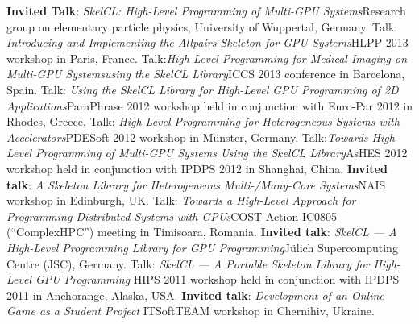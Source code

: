 \documentclass[11pt,a4paper]{moderncv}
\newcommand{\strong}[1]{\textcolor{color1}{\textbf{#1}}}
\begin{document}
         {\strong{Invited Talk}: \emph{SkelCL\@: High-Level Programming of Multi-GPU
          Systems}\newline \small Research group on elementary particle physics,
          University of Wuppertal, Germany.}
         {Talk: \emph{Introducing and Implementing the Allpairs Skeleton for GPU
          Systems}\newline \small HLPP 2013 workshop in Paris, France.}
         {Talk:\emph{High-Level Programming for Medical Imaging on Multi-GPU
          Systems\newline using the SkelCL Library}\newline \small ICCS 2013 conference in
          Barcelona, Spain.}
       {Talk: \emph{Using the SkelCL Library for High-Level GPU Programming of
        2D Applications}\newline \small ParaPhrase 2012 workshop held in
        conjunction with Euro-Par 2012 in Rhodes, Greece.}
       {Talk: \emph{High-Level Programming for Heterogeneous Systems with
        Accelerators}\newline \small PDESoft 2012 workshop in Münster, Germany.}
       {Talk:\emph{Towards High-Level Programming of Multi-GPU Systems Using
        the SkelCL Library}\newline \small AsHES 2012 workshop held in
        conjunction with IPDPS 2012 in Shanghai, China.}
       {\strong{Invited talk}: \emph{A Skeleton Library for Heterogeneous
        Multi-/Many-Core Systems}\newline \small NAIS workshop in Edinburgh, UK.}
       {Talk: \emph{Towards a High-Level Approach for Programming Distributed
        Systems with GPUs}\newline \small COST Action IC0805 (``ComplexHPC'')
        meeting in Timisoara, Romania.}
       {\strong{Invited talk}: \emph{SkelCL --- A High-Level Programming Library for GPU
        Programming}\newline \small Jülich Supercomputing Centre (JSC), Germany.}
       {Talk: \emph{SkelCL --- A Portable Skeleton Library for High-Level
        GPU Programming}\newline
        \small HIPS 2011 workshop held in conjunction with IPDPS 2011 in
        Anchorange, Alaska, USA.}
       {\strong{Invited talk}: \emph{Development of an Online Game as a Student Project}\newline
        \small ITSoftTEAM workshop in Chernihiv, Ukraine.}
\end{document}
